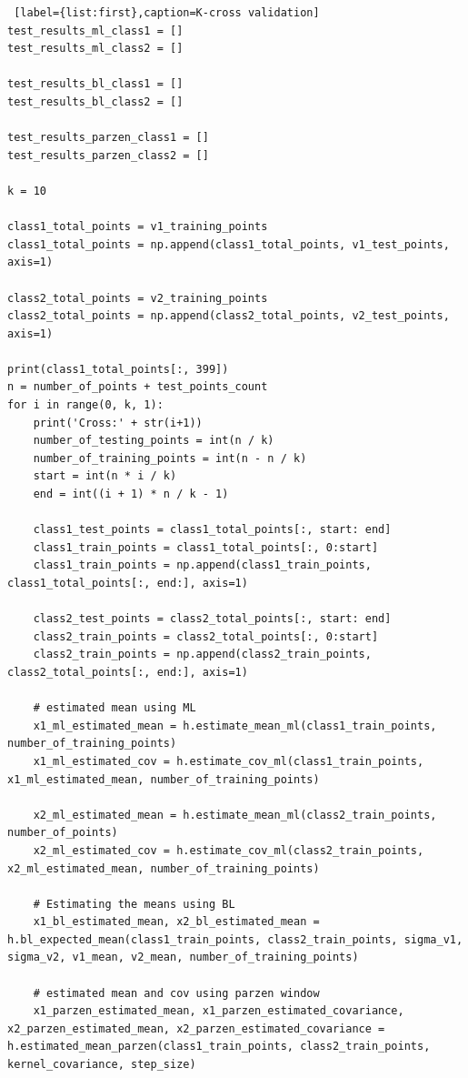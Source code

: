 \documentclass[11pt, oneside]{article}   	%
\begin{document}
\begin{lstlisting} [label={list:first},caption=K-cross validation]
test_results_ml_class1 = []
test_results_ml_class2 = []

test_results_bl_class1 = []
test_results_bl_class2 = []

test_results_parzen_class1 = []
test_results_parzen_class2 = []

k = 10

class1_total_points = v1_training_points
class1_total_points = np.append(class1_total_points, v1_test_points, axis=1)

class2_total_points = v2_training_points
class2_total_points = np.append(class2_total_points, v2_test_points, axis=1)

print(class1_total_points[:, 399])
n = number_of_points + test_points_count
for i in range(0, k, 1):
    print('Cross:' + str(i+1))
    number_of_testing_points = int(n / k)
    number_of_training_points = int(n - n / k)
    start = int(n * i / k)
    end = int((i + 1) * n / k - 1)

    class1_test_points = class1_total_points[:, start: end]
    class1_train_points = class1_total_points[:, 0:start]
    class1_train_points = np.append(class1_train_points, class1_total_points[:, end:], axis=1)

    class2_test_points = class2_total_points[:, start: end]
    class2_train_points = class2_total_points[:, 0:start]
    class2_train_points = np.append(class2_train_points, class2_total_points[:, end:], axis=1)

    # estimated mean using ML
    x1_ml_estimated_mean = h.estimate_mean_ml(class1_train_points, number_of_training_points)
    x1_ml_estimated_cov = h.estimate_cov_ml(class1_train_points, x1_ml_estimated_mean, number_of_training_points)

    x2_ml_estimated_mean = h.estimate_mean_ml(class2_train_points, number_of_points)
    x2_ml_estimated_cov = h.estimate_cov_ml(class2_train_points, x2_ml_estimated_mean, number_of_training_points)

    # Estimating the means using BL
    x1_bl_estimated_mean, x2_bl_estimated_mean = h.bl_expected_mean(class1_train_points, class2_train_points, sigma_v1, sigma_v2, v1_mean, v2_mean, number_of_training_points)

    # estimated mean and cov using parzen window
    x1_parzen_estimated_mean, x1_parzen_estimated_covariance, x2_parzen_estimated_mean, x2_parzen_estimated_covariance = h.estimated_mean_parzen(class1_train_points, class2_train_points, kernel_covariance, step_size)


\end{lstlisting}
\end{document}

